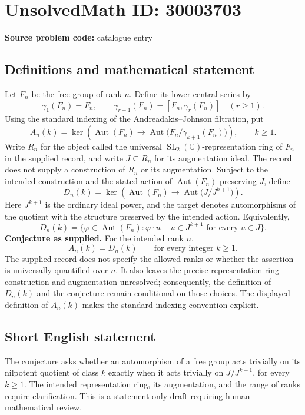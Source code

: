 \documentclass[11pt]{article}
\newcommand{\C}{\mathbb{C}}
\begin{document}
\section*{UnsolvedMath ID: 30003703}
\textbf{Source problem code:} catalogue entry
\subsection{Definitions and mathematical statement}
Let \(F_n\) be the free group of rank \(n\). Define its lower central series by
\[
\gamma_1(F_n)=F_n,\qquad \gamma_{r+1}(F_n)=[F_n,\gamma_r(F_n)]\quad(r\geq1).
\]
Using the standard indexing of the Andreadakis--Johnson filtration, put
\[
A_n(k)=\ker\!\left(\operatorname{Aut}(F_n)\longrightarrow\operatorname{Aut}\bigl(F_n/\gamma_{k+1}(F_n)\bigr)\right),\qquad k\geq1.
\]
Write \(R_n\) for the object called the universal \(\operatorname{SL}_2(\C)\)-representation ring of \(F_n\) in the supplied record, and write \(J\subseteq R_n\) for its augmentation ideal. The record does not supply a construction of \(R_n\) or its augmentation. Subject to the intended construction and the stated action of \(\operatorname{Aut}(F_n)\) preserving \(J\), define
\[
D_n(k)=\ker\!\left(\operatorname{Aut}(F_n)\longrightarrow\operatorname{Aut}\bigl(J/J^{k+1}\bigr)\right).
\]
Here \(J^{k+1}\) is the ordinary ideal power, and the target denotes automorphisms of the quotient with the structure preserved by the intended action. Equivalently,
\[
D_n(k)=\{\varphi\in\operatorname{Aut}(F_n):\varphi\cdot u-u\in J^{k+1}\text{ for every }u\in J\}.
\]
\textbf{Conjecture as supplied.} For the intended rank \(n\),
\[
A_n(k)=D_n(k)\qquad\text{for every integer }k\geq1.
\]
The supplied record does not specify the allowed ranks or whether the assertion is universally quantified over \(n\). It also leaves the precise representation-ring construction and augmentation unresolved; consequently, the definition of \(D_n(k)\) and the conjecture remain conditional on those choices. The displayed definition of \(A_n(k)\) makes the standard indexing convention explicit.
\subsection{Short English statement}
The conjecture asks whether an automorphism of a free group acts trivially on its nilpotent quotient of class \(k\) exactly when it acts trivially on \(J/J^{k+1}\), for every \(k\geq1\). The intended representation ring, its augmentation, and the range of ranks require clarification. This is a statement-only draft requiring human mathematical review.
\end{document}

